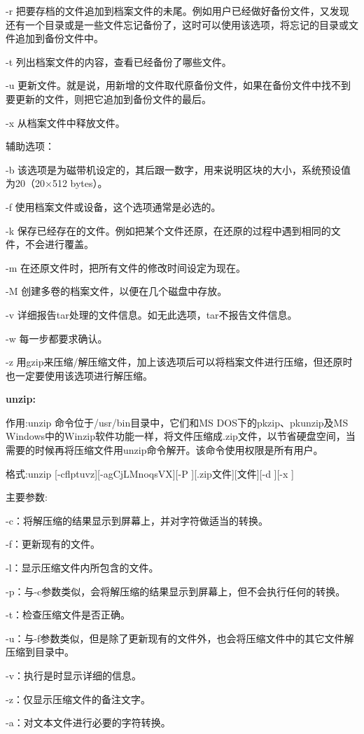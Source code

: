 -r 把要存档的文件追加到档案文件的未尾。例如用户已经做好备份文件，又发现还有一个目录或是一些文件忘记备份了，这时可以使用该选项，将忘记的目录或文件追加到备份文件中。

-t 列出档案文件的内容，查看已经备份了哪些文件。

-u 更新文件。就是说，用新增的文件取代原备份文件，如果在备份文件中找不到要更新的文件，则把它追加到备份文件的最后。

-x 从档案文件中释放文件。

辅助选项：

-b 该选项是为磁带机设定的，其后跟一数字，用来说明区块的大小，系统预设值为20（20×512 bytes）。

-f 使用档案文件或设备，这个选项通常是必选的。

-k 保存已经存在的文件。例如把某个文件还原，在还原的过程中遇到相同的文件，不会进行覆盖。

-m 在还原文件时，把所有文件的修改时间设定为现在。

-M 创建多卷的档案文件，以便在几个磁盘中存放。

-v 详细报告tar处理的文件信息。如无此选项，tar不报告文件信息。

-w 每一步都要求确认。

-z 用gzip来压缩/解压缩文件，加上该选项后可以将档案文件进行压缩，但还原时也一定要使用该选项进行解压缩。

\textbf{unzip:}

作用:unzip
命令位于/usr/bin目录中，它们和MS DOS下的pkzip、pkunzip及MS
Windows中的Winzip软件功能一样，将文件压缩成.zip文件，以节省硬盘空间，当需要的时候再将压缩文件用unzip命令解开。该命令使用权限是所有用户。

格式:unzip [-cflptuvz][-agCjLMnoqsVX][-P ][.zip文件][文件][-d ][-x ]

主要参数:

-c：将解压缩的结果显示到屏幕上，并对字符做适当的转换。

-f：更新现有的文件。

-l：显示压缩文件内所包含的文件。

-p：与-c参数类似，会将解压缩的结果显示到屏幕上，但不会执行任何的转换。

-t：检查压缩文件是否正确。

-u：与-f参数类似，但是除了更新现有的文件外，也会将压缩文件中的其它文件解压缩到目录中。

-v：执行是时显示详细的信息。

-z：仅显示压缩文件的备注文字。

-a：对文本文件进行必要的字符转换。

